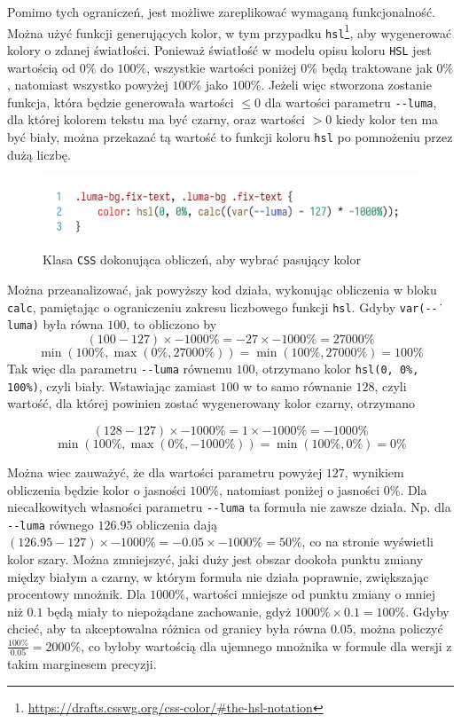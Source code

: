\documentclass[licencjacka]{pracadypl}
\begin{document}
Pomimo tych ograniczeń, jest możliwe zareplikować wymaganą funkcjonalność. Można użyć funkcji generujących kolor, w tym przypadku \texttt{hsl}\footnote{\url{https://drafts.csswg.org/css-color/\#the-hsl-notation}}, aby wygenerować kolory o zdanej światłości. Ponieważ światłość w modelu opisu koloru \texttt{HSL} jest wartością od $0\%$ do $100\%$, wszystkie wartości poniżej $0\%$ będą traktowane jak $0\%$, natomiast wszystko powyżej $100\%$ jako $100\%$. Jeżeli więc stworzona zostanie funkcja, która będzie generowała wartości $\leq 0$ dla wartości parametru \texttt{-\.-luma}, dla której kolorem tekstu ma być czarny, oraz wartości $> 0$ kiedy kolor ten ma być biały, można przekazać tą wartość to funkcji koloru \texttt{hsl} po pomnożeniu przez dużą liczbę.

\begin{figure}[H]
  \centering
  \includegraphics[width=\linewidth/\real{1.2}]{images/code-css-luma-calc.png}
  \caption{Klasa \texttt{CSS} dokonująca obliczeń, aby wybrać pasujący kolor}
  \label{fig:css-css-luma-calc}
\end{figure}

Można przeanalizować, jak powyższy kod działa, wykonując obliczenia w bloku \texttt{calc}, pamiętając o ograniczeniu zakresu liczbowego funkcji \texttt{hsl}. Gdyby \texttt{var(-\.-luma)} była równa $100$, to obliczono by
\[
  \left(100-127\right) \times -1000\% = -27 \times -1000\% = 27000\%
\]
\[
  \min\left(100\%, \max\left(0\%, 27000\%\right)\right) = \min\left(100\%, 27000\%\right) = 100\%
\]
Tak więc dla parametru \texttt{-\.-luma} równemu $100$, otrzymano kolor \texttt{hsl(0, 0\%, 100\%)}, czyli biały. Wstawiając zamiast $100$ w to samo równanie $128$, czyli wartość, dla której powinien zostać wygenerowany kolor czarny, otrzymano

\[
  \left(128-127\right) \times -1000\% = 1 \times -1000\% = -1000\%
\]
\[
  \min\left(100\%, \max\left(0\%, -1000\%\right)\right) = \min\left(100\%, 0\%\right) = 0\%
\]

Można wiec zauważyć, że dla wartości parametru powyżej $127$, wynikiem obliczenia będzie kolor o jasności $100\%$, natomiast poniżej o jasności $0\%$. Dla niecałkowitych własności parametru \texttt{-\.-luma} ta formuła nie zawsze działa. Np. dla \texttt{-\.-luma} równego $126.95$ obliczenia dają $\left(126.95-127\right)\times-1000\% = -0.05 \times -1000\% = 50\%$, co na stronie wyświetli kolor szary. Można zmniejszyć, jaki duży jest obszar dookoła punktu zmiany między białym a czarny, w którym formuła nie działa poprawnie, zwiększając procentowy mnożnik. Dla $1000\%$, wartości mniejsze od punktu zmiany o mniej niż $0.1$ będą miały to niepożądane zachowanie, gdyż $1000\%\times0.1 = 100\%$. Gdyby chcieć, aby ta akceptowalna różnica od granicy była równa $0.05$, można policzyć $\frac{100\%}{0.05} = 2000\%$, co byłoby wartością dla ujemnego mnożnika \linebreak w formule dla wersji z takim marginesem precyzji.
\end{document}
